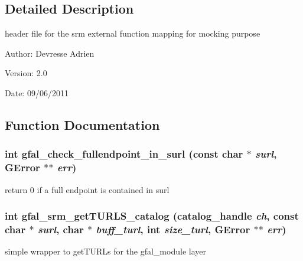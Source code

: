 \subsection{Detailed Description}
header file for the srm external function mapping for mocking purpose 

\begin{Desc}
\item[Author:]Devresse Adrien \end{Desc}
\begin{Desc}
\item[Version:]2.0 \end{Desc}
\begin{Desc}
\item[Date:]09/06/2011 \end{Desc}


\subsection{Function Documentation}
\subsubsection{\setlength{\rightskip}{0pt plus 5cm}int gfal\_\-check\_\-fullendpoint\_\-in\_\-surl (const char $\ast$ {\em surl}, GError $\ast$$\ast$ {\em err})}\label{gfal__common__srm__internal__layer_8h_d12926fb068b66769f28f2c4fc177bd2}


return 0 if a full endpoint is contained in surl 
\subsubsection{\setlength{\rightskip}{0pt plus 5cm}int gfal\_\-srm\_\-get\-TURLS\_\-catalog (catalog\_\-handle {\em ch}, const char $\ast$ {\em surl}, char $\ast$ {\em buff\_\-turl}, int {\em size\_\-turl}, GError $\ast$$\ast$ {\em err})}\label{gfal__common__srm__internal__layer_8h_696b46d517fcc84154af45e43ecd73f9}


simple wrapper to get\-TURLs for the gfal\_\-module layer 